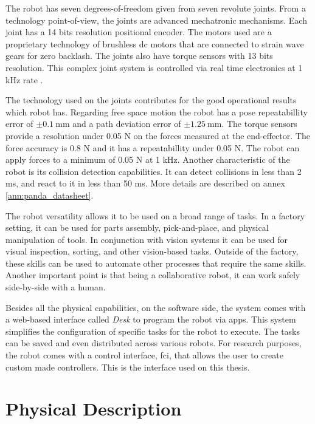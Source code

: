 The robot has seven degrees-of-freedom given from seven revolute joints. From a technology point-of-view, the joints are advanced mechatronic mechanisms. Each joint has a 14 bits resolution positional encoder. The motors used are a proprietary technology of brushless dc motors that are connected to strain wave gears for zero backlash. The joints also have torque sensors with 13 bits resolution. This complex joint system is controlled via real time electronics at 1 kHz rate \cite{FrankaEmikaGmbH_technology}.

The technology used on the joints contributes for the good operational results which robot has. Regarding free space motion the robot has a pose repeatabillity error of $\pm \SI{0.1}{\milli\meter}$ and a path deviation error of $\pm \SI{1.25}{\milli\meter}$. The torque sensors provide a resolution under 0.05 N on the forces measured at the end-effector. The force accuracy is 0.8 N and it has a repeatabillity under 0.05 N. The robot can apply forces to a minimum of 0.05 N at 1 kHz. Another characteristic of the robot is its collision detection capabilities. It can detect collisions in less than 2 ms, and react to it in less than 50 ms. More details are described on annex \ref{ann:panda_datasheet}.

The robot versatility allows it to be used on a broad range of tasks. In a factory setting, it can be used for parts assembly, pick-and-place, and physical manipulation of tools. In conjunction with vision systems it can be used for visual inspection, sorting, and other vision-based tasks. Outside of the factory, these skills can be used to automate other processes that require the same skills. Another important point is that being a collaborative robot, it can work safely side-by-side with a human.

Besides all the physical capabilities, on the software side, the system comes with a web-based interface called \emph{Desk} to program the robot via apps. This system simplifies the configuration of specific tasks for the robot to execute. The tasks can be saved and even distributed across various robots. For research purposes, the robot comes with a control interface, \gls{fci}, that allows the user to create custom made controllers. This is the interface used on this thesis.



\section{Physical Description}
\label{sec:robotic_system_physical_description}

